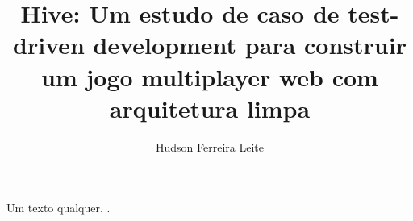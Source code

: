 \documentclass[12pt,a4paper]{article}
\title{Hive: Um estudo de caso de test-driven development para construir um jogo
multiplayer web com arquitetura limpa}
\author{Hudson Ferreira Leite}
\begin{document}
Um texto qualquer. \cite{freeman2009}.


\end{document}
